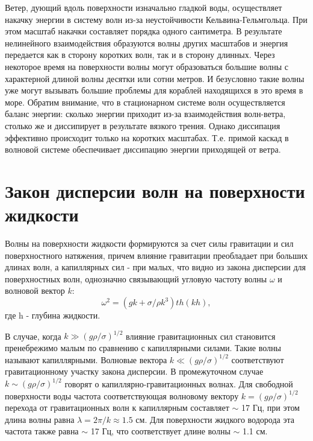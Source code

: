 Ветер, дующий вдоль поверхности изначально гладкой воды, осуществляет накачку энергии в систему волн из-за неустойчивости Кельвина-Гельмгольца. При этом масштаб накачки составляет порядка одного сантиметра. В результате нелинейного взаимодействия образуются волны других масштабов и энергия передается как в сторону коротких волн, так и в сторону длинных. Через некоторое время на поверхности волны могут образоваться большие волны с характерной длиной волны десятки или сотни метров. И безусловно такие волны уже могут вызывать большие проблемы для кораблей находящихся в это время в море. 
	Обратим внимание, что в стационарном системе волн осуществляется баланс энергии: сколько энергии приходит из-за взаимодействия волн-ветра, столько же и диссипирует в результате вязкого трения. Однако диссипация эффективно происходит только на коротких масштабах. Т.е. примой каскад в волновой системе обеспечивает диссипацию энергии приходящей от ветра. %


\section{Закон дисперсии волн на поверхности жидкости}%

Волны на поверхности жидкости формируются за счет силы гравитации и сил поверхностного натяжения, причем влияние гравитации преобладает при больших длинах волн, а капиллярных сил - при малых, что видно из закона дисперсии для поверхностных волн, однозначно связывающий угловую частоту волны $\omega$ и волновой вектор $k$:
\begin{equation}
 \label{eq:disper_dip}
\omega^2 = (gk + \sigma/\rho k^3)th(kh),
\end{equation}
где h - глубина жидкости.

В случае, когда $k \gg (g\rho/\sigma)^{1/2}$ влияние гравитационных сил становится пренебрежимо малым по сравнению 
с капиллярными силами. Такие волны называют капиллярными. Волновые вектора $k \ll (g\rho/\sigma)^{1/2}$ соответствуют гравитационному участку закона дисперсии. В промежуточном случае $k \sim (g\rho/\sigma)^{1/2}$ говорят о капиллярно-гравитационных волнах. Для свободной поверхности воды частота соответствующая волновому вектору $k = (g\rho/\sigma)^{1/2}$ перехода от гравитационных волн к капиллярным составляет $\sim$ 17 Гц, при этом длина волны равна $\lambda = 2\pi/k \approx 1.5$ см. Для поверхности жидкого водорода эта частота также равна $\sim$ 17 Гц, что соответствует длине волны $\sim$ 1.1 см.



